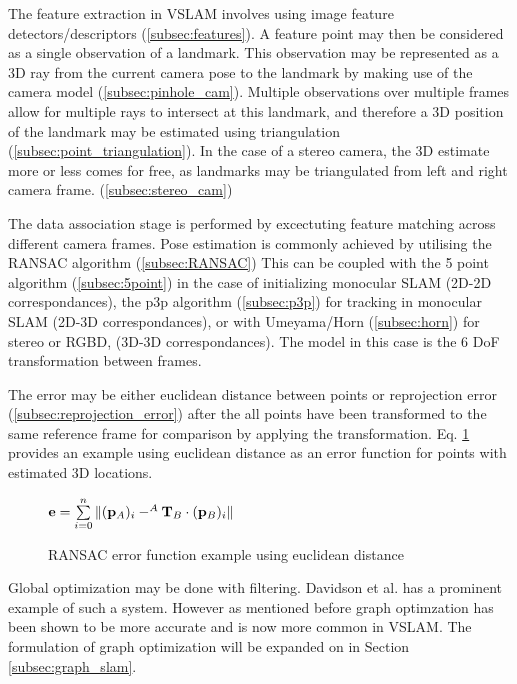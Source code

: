 The feature extraction in VSLAM involves using image feature detectors/descriptors (\ref{subsec:features}).  A feature point may then be considered as a single observation of a landmark.  This observation may be represented as a 3D ray from the current camera pose to the landmark by making use of the camera model (\ref{subsec:pinhole_cam}).  Multiple observations over multiple frames allow for multiple rays to intersect at this landmark, and therefore a 3D position of the landmark may be estimated using triangulation (\ref{subsec:point_triangulation}). In the case of a stereo camera, the 3D estimate more or less comes for free, as landmarks may be triangulated from left and right camera frame. (\ref{subsec:stereo_cam})

The data association stage is performed by excectuting feature matching across different camera frames. Pose estimation is commonly achieved by utilising the RANSAC algorithm (\ref{subsec:RANSAC}) This can be coupled with the 5 point algorithm (\ref{subsec:5point}) in the case of initializing monocular SLAM (2D-2D correspondances), the p3p algorithm (\ref{subsec:p3p}) for tracking in monocular SLAM (2D-3D correspondances), or with Umeyama/Horn (\ref{subsec:horn}) for stereo or RGBD, (3D-3D correspondances). The model in this case is the 6 DoF transformation between frames. 

The error may be either euclidean distance between points or reprojection error (\ref{subsec:reprojection_error}) after the all points have been transformed to the same reference frame for comparison by applying the transformation. Eq. \ref{eq:ransac_error} provides an example using euclidean distance as an error function for points with estimated 3D locations.

\begin{figure}[h]
 \centering
 \begin{math}
  \mathbf{e} = \sum\limits_{i=0}^n \| (\mathbf p_A)_i - ^A\mathbf T_B \cdot (\mathbf p_B)_i \|
 \end{math}
 \caption{RANSAC error function example using euclidean distance}
 \label{eq:ransac_error}
\end{figure}

Global optimization may be done with filtering.  Davidson et al. has a prominent example of such a system.  However as mentioned before graph optimzation has been shown to be more accurate and is now more common in VSLAM.  The formulation of graph optimization will be expanded on in Section \ref{subsec:graph_slam}.

